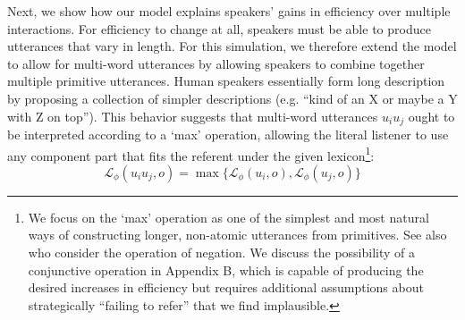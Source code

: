 Next, we show how our model explains speakers' gains in efficiency over multiple interactions. 
For efficiency to change at all, speakers must be able to produce utterances that vary in length. 
For this simulation, we therefore extend the model to allow for multi-word utterances by allowing speakers to combine together multiple primitive utterances.
Human speakers essentially form long description by proposing a collection of simpler descriptions (e.g. ``kind of an X or maybe a Y with Z on top''). 
This behavior suggests that multi-word utterances $u_iu_j$ ought to be interpreted according to a `max' operation, allowing the literal listener to use any component part that fits the referent under the given lexicon\footnote{We focus on the `max' operation as one of the simplest and most natural ways of constructing longer, non-atomic utterances from primitives. See also  who consider the operation of negation. We discuss the possibility of a conjunctive operation in Appendix B, which is capable of producing the desired increases in efficiency but requires additional assumptions about strategically ``failing to refer'' that we find implausible.}:
$$\mathcal{L}_\phi(u_iu_j, o) = \max\{\mathcal{L}_\phi(u_i, o) , \mathcal{L}_\phi(u_j, o)\}$$
